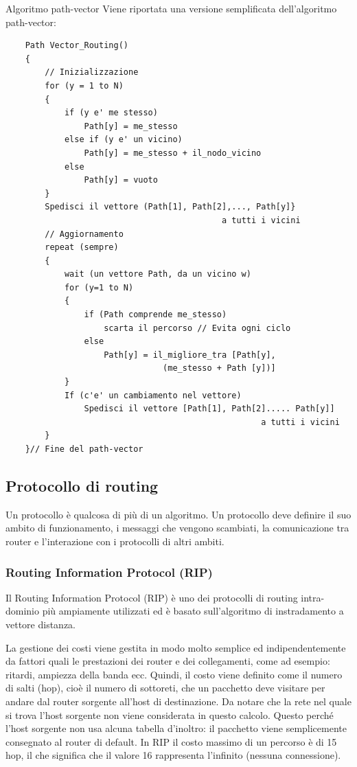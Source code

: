 \begin{Algoritmo}{Algoritmo path-vector}{}
    Viene riportata una versione semplificata dell'algoritmo path-vector:
    \begin{lstlisting}
    Path Vector_Routing()
    {
        // Inizializzazione
        for (y = 1 to N)
        {
            if (y e' me stesso)
                Path[y] = me_stesso
            else if (y e' un vicino)
                Path[y] = me_stesso + il_nodo_vicino
            else
                Path[y] = vuoto
        }
        Spedisci il vettore (Path[1], Path[2],..., Path[y]} 
                                            a tutti i vicini
        // Aggiornamento
        repeat (sempre)
        {
            wait (un vettore Path, da un vicino w)
            for (y=1 to N)
            {
                if (Path comprende me_stesso)
                    scarta il percorso // Evita ogni ciclo
                else
                    Path[y] = il_migliore_tra [Path[y], 
                                (me_stesso + Path [y])]
            }
            If (c'e' un cambiamento nel vettore)
                Spedisci il vettore [Path[1], Path[2]..... Path[y]] 
                                                    a tutti i vicini
        }
    }// Fine del path-vector
    \end{lstlisting}
\end{Algoritmo}

\subsection{Protocollo di routing}
Un protocollo è qualcosa di più di un algoritmo. Un protocollo deve definire il suo ambito di
funzionamento, i messaggi che vengono scambiati, la comunicazione tra router e l’interazione con i protocolli di altri ambiti.

\subsubsection{Routing Information Protocol (RIP)}
Il Routing Information Protocol (RIP) è uno dei protocolli di routing intra-dominio più ampiamente utilizzati ed è basato sull'algoritmo di instradamento a vettore distanza.

La gestione dei costi viene gestita in modo molto semplice ed indipendentemente da fattori quali le prestazioni dei router e dei collegamenti, come ad esempio: ritardi, ampiezza della banda ecc. Quindi, il costo viene definito come il numero di salti (hop), cioè il numero di sottoreti, che un pacchetto deve visitare per andare dal router sorgente all'host di destinazione. Da notare che la rete nel quale si trova l'host sorgente non viene considerata in questo calcolo. Questo perché l'host sorgente non usa alcuna tabella d'inoltro: il pacchetto viene semplicemente consegnato al router di default. In RIP il costo massimo di un percorso è di 15 hop, il che significa che il valore 16 rappresenta l'infinito (nessuna connessione).

